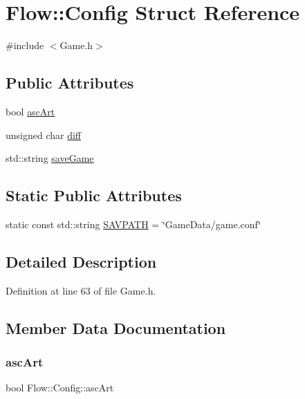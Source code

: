 \hypertarget{struct_flow_1_1_config}{}\section{Flow\+:\+:Config Struct Reference}
\label{struct_flow_1_1_config}


{\ttfamily \#include $<$Game.\+h$>$}

\subsection*{Public Attributes}
\begin{DoxyCompactItemize}
\item 
bool \hyperlink{struct_flow_1_1_config_a51c66f664ea0d03483dfacb772ec893f}{asc\+Art}
\item 
unsigned char \hyperlink{struct_flow_1_1_config_a0ea347143bb4a8156d1c54871aca1084}{diff}
\item 
std\+::string \hyperlink{struct_flow_1_1_config_ae9c7f4511035a6c6dbf177435d8835c3}{save\+Game}
\end{DoxyCompactItemize}
\subsection*{Static Public Attributes}
\begin{DoxyCompactItemize}
\item 
static const std\+::string \hyperlink{struct_flow_1_1_config_ab720407eb6a5120f4ae3923cd00e2b30}{S\+A\+V\+P\+A\+TH} = \char`\"{}Game\+Data/game.\+conf\char`\"{}
\end{DoxyCompactItemize}


\subsection{Detailed Description}


Definition at line 63 of file Game.\+h.



\subsection{Member Data Documentation}
\hypertarget{struct_flow_1_1_config_a51c66f664ea0d03483dfacb772ec893f}{}\label{struct_flow_1_1_config_a51c66f664ea0d03483dfacb772ec893f} 
\subsubsection{\texorpdfstring{asc\+Art}{ascArt}}
{\footnotesize\ttfamily bool Flow\+::\+Config\+::asc\+Art}



